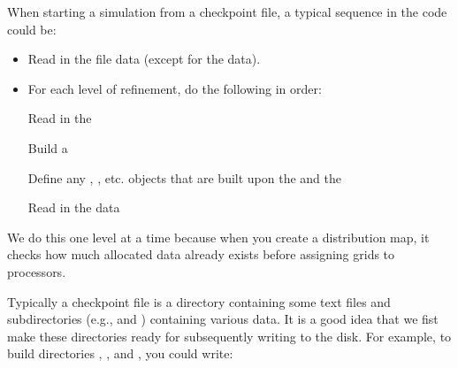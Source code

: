 \documentclass[letterpaper,10pt,english]{sphinxmanual}
\begin{document}
\sphinxAtStartPar
When starting a simulation from a checkpoint file, a typical sequence in the code
could be:
\begin{itemize}
\item {} 
\sphinxAtStartPar
Read in the  file data (except for the  data).

\item {} 
\sphinxAtStartPar
For each level of refinement, do the following in order:

\sphinxAtStartPar
\textendash{} Read in the 

\sphinxAtStartPar
\textendash{} Build a 

\sphinxAtStartPar
\textendash{} Define any , , etc. objects that are built upon the
 and the 

\sphinxAtStartPar
\textendash{} Read in the  data

\end{itemize}

\sphinxAtStartPar
We do this one level at a time because when you create a distribution map,
it checks how much allocated  data already exists before assigning
grids to processors.

\sphinxAtStartPar
Typically a checkpoint file is a directory containing some text files
and sub\sphinxhyphen{}directories (e.g.,  and )
containing various data. It is a good idea that we fist make these
directories ready for subsequently writing to the disk. For example,
to build directories , , and
, you could write:
\end{document}
